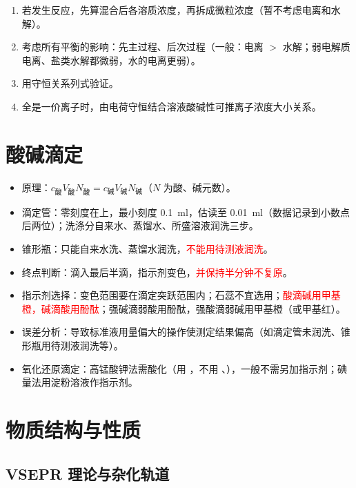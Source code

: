             \begin{enumerate}
                \item 若发生反应，先算混合后各溶质浓度，再拆成微粒浓度（暂不考虑电离和水解）。
                \item 考虑所有平衡的影响：先主过程、后次过程（一般：电离 \(>\) 水解；弱电解质电离、盐类水解都微弱，水的电离更弱）。
                \item 用守恒关系列式验证。
                \item 全是一价离子时，由电荷守恒结合溶液酸碱性可推离子浓度大小关系。
            \end{enumerate}

    \section{酸碱滴定}\label{app:知识点-滴定}

        \begin{itemize}
            \item 原理：\(c_\text{酸} V_\text{酸} N_\text{酸} = c_\text{碱} V_\text{碱} N_\text{碱}\)（\(N\) 为酸、碱元数）。
            \item 滴定管：零刻度在上，最小刻度 \SI{0.1}{\milli\litre}，估读至 \SI{0.01}{\milli\litre}（数据记录到小数点后两位）；洗涤分自来水、蒸馏水、所盛溶液润洗三步。
            \item 锥形瓶：只能自来水洗、蒸馏水润洗，\textcolor{red}{不能用待测液润洗}。
            \item 终点判断：滴入最后半滴，指示剂变色，\textcolor{red}{并保持半分钟不复原}。
            \item 指示剂选择：变色范围要在滴定突跃范围内；石蕊不宜选用；\textcolor{red}{酸滴碱用甲基橙，碱滴酸用酚酞}；强碱滴弱酸用酚酞，强酸滴弱碱用甲基橙（或甲基红）。
            \item 误差分析：导致标准液用量偏大的操作使测定结果偏高（如滴定管未润洗、锥形瓶用待测液润洗等）。
            \item 氧化还原滴定：高锰酸钾法需酸化（用 ，不用 、），一般不需另加指示剂；碘量法用淀粉溶液作指示剂。
        \end{itemize}

    \section{物质结构与性质}\label{app:知识点-结构性质}

        \subsection{VSEPR 理论与杂化轨道}

